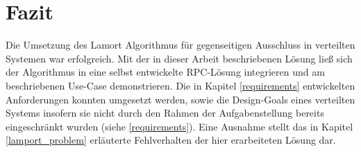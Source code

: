 %
\chapter{Fazit}

Die Umsetzung des Lamort Algorithmus für gegenseitigen Ausschluss in verteilten Systemen war erfolgreich.
Mit der in dieser Arbeit beschriebenen Lösung ließ sich der Algorithmus in eine selbst entwickelte
RPC-Lösung integrieren und am beschriebenen Use-Case demonstrieren. Die in Kapitel \ref{requirements}
entwickelten Anforderungen konnten umgesetzt werden, sowie die Design-Goals eines verteilten Systems
\citep{tanenbaumvansteen} insofern sie nicht durch den Rahmen der Aufgabenstellung bereits eingeschränkt
wurden (siehe \ref{requirements}). Eine Ausnahme stellt das in Kapitel \ref{lamport_problem} erläuterte
Fehlverhalten der hier erarbeiteten Lösung dar.
